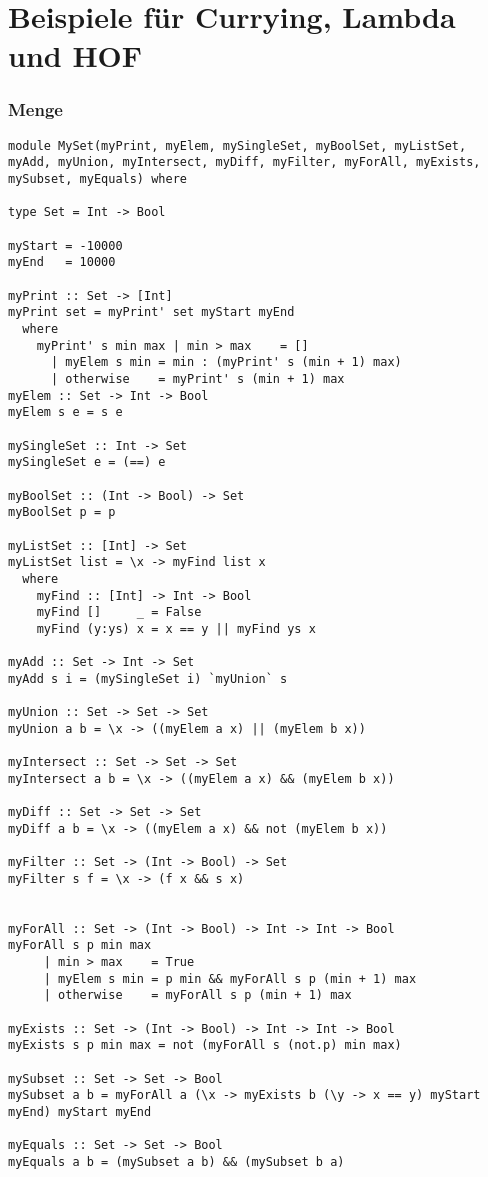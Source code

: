\documentclass[fleqn,11pt,aspectratio=43]{beamer}
\begin{document}
\section{Beispiele für Currying, Lambda und HOF}

\begin{frame}
\frametitle{Menge}
\begin{lstlisting}
module MySet(myPrint, myElem, mySingleSet, myBoolSet, myListSet, myAdd, myUnion, myIntersect, myDiff, myFilter, myForAll, myExists, mySubset, myEquals) where

type Set = Int -> Bool

myStart = -10000
myEnd   = 10000

myPrint :: Set -> [Int]
myPrint set = myPrint' set myStart myEnd
  where
    myPrint' s min max | min > max    = []
      | myElem s min = min : (myPrint' s (min + 1) max)
      | otherwise    = myPrint' s (min + 1) max
myElem :: Set -> Int -> Bool
myElem s e = s e

mySingleSet :: Int -> Set
mySingleSet e = (==) e

myBoolSet :: (Int -> Bool) -> Set
myBoolSet p = p

myListSet :: [Int] -> Set
myListSet list = \x -> myFind list x
  where
    myFind :: [Int] -> Int -> Bool
    myFind []     _ = False
    myFind (y:ys) x = x == y || myFind ys x

myAdd :: Set -> Int -> Set
myAdd s i = (mySingleSet i) `myUnion` s

myUnion :: Set -> Set -> Set
myUnion a b = \x -> ((myElem a x) || (myElem b x))

myIntersect :: Set -> Set -> Set
myIntersect a b = \x -> ((myElem a x) && (myElem b x))

myDiff :: Set -> Set -> Set
myDiff a b = \x -> ((myElem a x) && not (myElem b x))

myFilter :: Set -> (Int -> Bool) -> Set
myFilter s f = \x -> (f x && s x)


myForAll :: Set -> (Int -> Bool) -> Int -> Int -> Bool
myForAll s p min max 
     | min > max    = True
     | myElem s min = p min && myForAll s p (min + 1) max
     | otherwise    = myForAll s p (min + 1) max

myExists :: Set -> (Int -> Bool) -> Int -> Int -> Bool
myExists s p min max = not (myForAll s (not.p) min max)

mySubset :: Set -> Set -> Bool
mySubset a b = myForAll a (\x -> myExists b (\y -> x == y) myStart myEnd) myStart myEnd 

myEquals :: Set -> Set -> Bool
myEquals a b = (mySubset a b) && (mySubset b a)
\end{lstlisting}
\end{frame}
\end{document}
